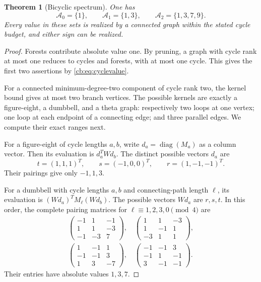 \documentclass[11pt]{article}
\numberwithin{equation}{section}
\newtheorem{theorem}{Theorem}[section]
\theoremstyle{definition}
\newcommand{\diag}{\operatorname{diag}}
\begin{document}
\begin{theorem}[Bicyclic spectrum]\label{cb:thm:bicyclic}
One has
\begin{equation}\label{cb:eq:bicyclic}
 \mathcal A_0=\{1\},\qquad \mathcal A_1=\{1,3\},\qquad
 \mathcal A_2=\{1,3,7,9\}.
\end{equation}
Every value in these sets is realized by a connected graph within the
stated cycle budget, and either sign can be realized.
\end{theorem}
\begin{proof}
Forests contribute absolute value one. By pruning, a graph with cycle rank
at most one reduces to cycles and forests, with at most one cycle. This
gives the first two assertions by \eqref{cb:eq:cyclevalue}.

For a connected minimum-degree-two component of cycle rank two, the
kernel bound gives at most two branch vertices. The possible kernels are
exactly a figure-eight, a dumbbell, and a theta graph: respectively two
loops at one vertex; one loop at each endpoint of a connecting edge; and
three parallel edges. We compute their exact ranges next.

For a figure-eight of cycle lengths $a,b$, write $d_a=\diag(M_a)$ as a
column vector. Then its evaluation is $d_a^TWd_b$. The distinct possible
vectors $d_a$ are
\[
 t=(1,1,1)^T,\qquad s=(-1,0,0)^T,\qquad r=(1,-1,-1)^T.
\]
Their pairings give only $-1,1,3$.

For a dumbbell with cycle lengths $a,b$ and connecting-path length $\ell$,
its evaluation is $(Wd_a)^TM_\ell(Wd_b)$. The possible vectors $Wd_a$
are $r,s,t$. In this order, the complete pairing matrices for
$\ell\equiv1,2,3,0\pmod4$ are
\begin{equation}\label{cb:eq:dumbbelltable}
\begin{gathered}
 \begin{pmatrix}-1&1&-1\\1&1&-3\\-1&-3&7\end{pmatrix},\quad
 \begin{pmatrix}1&1&-3\\1&-1&1\\-3&1&1\end{pmatrix},\\[2mm]
 \begin{pmatrix}1&-1&1\\-1&-1&3\\1&3&-7\end{pmatrix},\quad
 \begin{pmatrix}-1&-1&3\\-1&1&-1\\3&-1&-1\end{pmatrix}.
\end{gathered}
\end{equation}
Their entries have absolute values $1,3,7$.


\end{proof}
\end{document}
